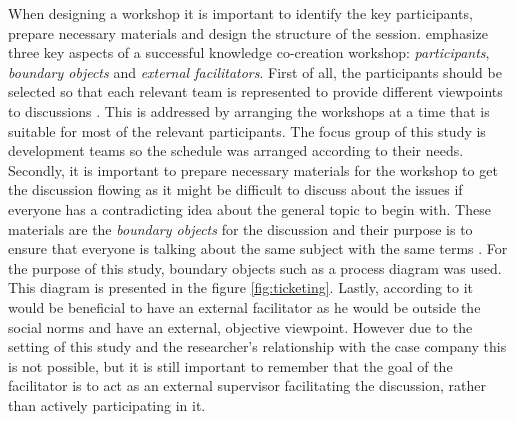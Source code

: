 When designing a workshop it is important to identify the key participants, prepare necessary materials and design the structure of the session. \citet{Smeds2015} emphasize
three key aspects of a successful knowledge co-creation workshop: \emph{participants}, \emph{boundary objects} and \emph{external facilitators}. First of all, the participants
should be selected so that each relevant team is represented to provide different viewpoints to discussions \citep{Smeds2015}.
This is addressed by arranging the workshops at a time that
is suitable for most of the relevant participants. The focus group of this study is development teams so the schedule was arranged according to their needs. Secondly,
it is important to prepare necessary materials for the workshop to get the discussion flowing as it might be difficult to discuss about the issues if everyone has a
contradicting idea about the general topic to begin with. These materials are the \emph{boundary objects} for the discussion and their purpose is to ensure that everyone
is talking about the same subject with the same terms \citep{Akkerman2011}. For the purpose of this study, boundary objects such as a process diagram was used. This diagram
is presented in the figure \ref{fig:ticketing}. Lastly, according to \citet{Smeds2015} it would be beneficial to have an external facilitator as he would be
outside the social norms and have an external, objective viewpoint. However due to the setting of this study and the researcher's relationship with the case company
this is not possible, but it is still important to remember that the goal of the facilitator is to act as an external supervisor facilitating the discussion, rather than actively participating in it.

